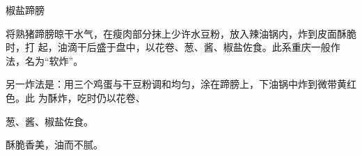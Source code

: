 \begin{recipe}{椒盐蹄膀}

\ingredients


\cooking

将熟猪蹄膀晾干水气，在瘦肉部分抹上少许水豆粉，放入辣油锅内，炸到皮面酥脆时，打
起，油滴干后盛于盘中，以花卷、葱、酱、椒盐佐食。此系重庆一般作法，名为“软炸”。

另一炸法是：用三个鸡蛋与干豆粉调和均匀，涂在蹄膀上，下油锅中炸到微带黄红色。此
为酥炸，吃时仍以花卷、

葱、酱、椒盐佐食。

\notes

酥脆香美，油而不腻。

\end{recipe}

